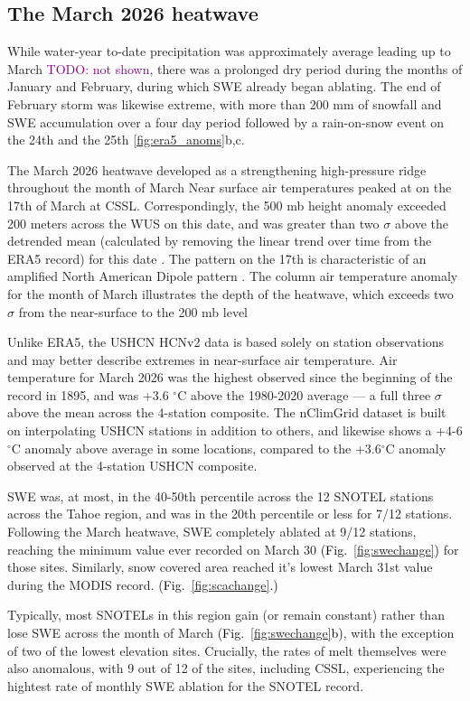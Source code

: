\documentclass[12pt]{iopjournal}
\newcommand{\fig}[2]{\textcolor{black}{(Fig.~\ref{#1}{#2})}}   %
\newcommand{\comment}[1]{\textcolor{purple}{TODO: #1}}      %
\begin{document}
\subsection{The March 2026 heatwave}
While water-year to-date precipitation was approximately average leading up to March \comment{not shown}, there was a prolonged dry period during the months of January and February, during which SWE already began ablating.
The end of February storm was likewise extreme, with more than 200 mm of snowfall and SWE accumulation over a four day period followed by a rain-on-snow event on the 24th and the 25th \ref{fig:era5_anoms}{b,c}.

The March 2026 heatwave developed as a strengthening high-pressure ridge throughout the month of March 
Near surface air temperatures peaked at  on the 17th of March at CSSL. 
Correspondingly, the 500 mb height anomaly exceeded 200 meters across the WUS on this date, and was greater than two $\sigma$ above the detrended mean (calculated by removing the linear trend over time from the ERA5 record) for this date \cite{Lee2023-cc}.
The pattern on the 17th is characteristic of an amplified North American Dipole pattern \citep{Singh2016-ev}.
The column air temperature anomaly for the month of March illustrates the depth of the heatwave, which exceeds two $\sigma$ from the near-surface to the 200 mb level 

Unlike ERA5, the USHCN HCNv2 data is based solely on station observations and may better describe extremes in near-surface air temperature. 
Air temperature for March 2026 was the highest observed since the beginning of the record in 1895, and was +3.6 $^\circ$C above the 1980-2020 average --- a full three $\sigma$ above the mean across the 4-station composite. 
The nClimGrid dataset is built on interpolating USHCN stations in addition to others, and likewise shows a +4-6 $^\circ$C anomaly above average in some locations, compared to the +3.6$^\circ$C anomaly observed at the 4-station USHCN composite.

SWE was, at most, in the 40-50th percentile across the 12 SNOTEL stations across the Tahoe region, and was in the 20th percentile or less for 7/12 stations. 
Following the March heatwave, SWE completely ablated at 9/12 stations, reaching the minimum value ever recorded on March 30 \fig{fig:swechange}{} for those sites.
Similarly, snow covered area reached it's lowest March 31st value during the MODIS record.
\fig{fig:scachange}.

Typically, most SNOTELs in this region gain (or remain constant) rather than lose SWE across the month of March \fig{fig:swechange}{b}, with the exception of two of the lowest elevation sites.
Crucially, the rates of melt themselves were also anomalous, with 9 out of 12 of the sites, including CSSL, experiencing the hightest rate of monthly SWE ablation for the SNOTEL record. 
\end{document}
